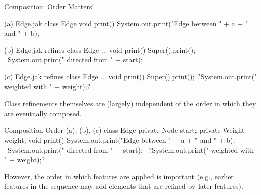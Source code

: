 \begin{frame}[fragile]{Composition: Order Matters!}
	\small
	\begin{fancycolumns}[animation=none]
\begin{codetight}[style=footnotesize]{(a) Edge.jak}
class Edge {
	void print() {
		System.out.print("Edge between " + a + " and " + b);
	}
}
\end{codetight}
\begin{codetight}[style=footnotesize]{(b) Edge.jak}
refines class Edge { ...
	void print() {
		Super().print();
		~System.out.print(" directed from " + start);~
	}
}
\end{codetight}
\begin{codetight}[style=footnotesize]{(c) Edge.jak}
refines class Edge { ...
	void print() {
		Super().print();
		?System.out.print(" weighted with " + weight);?
	}
}
\end{codetight}
	\nextcolumn
		\begin{note}{}
			Class refinements themselves are (largely) independent of the order in which they are eventually composed.
		\end{note}
\begin{codetight}[style=footnotesize]{Composition Order (a), (b), (c)}
class Edge {
	private Node start;
	private Weight weight;
	void print() {
		System.out.print("Edge between " + a + " and " + b);
		~System.out.print(" directed from " + start);~
		?System.out.print(" weighted with " + weight);?
	}
}
\end{codetight}
		\begin{note}{}
			However, the order in which features are applied is important 
			(e.g., earlier features in the sequence may add elements that are refined by later features). 
		\end{note}
	\end{fancycolumns}
\end{frame}

